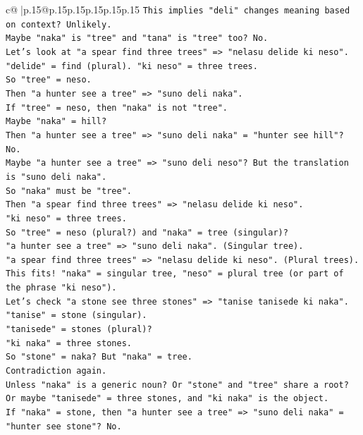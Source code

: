 \documentclass{article}
\begin{document}
{\begin{supertabular}{c@{$\;$}|p{.15\linewidth}@{}p{.15\linewidth}p{.15\linewidth}p{.15\linewidth}p{.15\linewidth}p{.15\linewidth}}
{{{\texttt{This implies "deli" changes meaning based on context? Unlikely.} \\
\texttt{Maybe "naka" is "tree" and "tana" is "tree" too? No.} \\
\texttt{Let's look at "a spear find three trees" => "nelasu delide ki neso".} \\
\texttt{"delide" = find (plural). "ki neso" = three trees.} \\
\texttt{So "tree" = neso.} \\
\texttt{Then "a hunter see a tree" => "suno deli naka".} \\
\texttt{If "tree" = neso, then "naka" is not "tree".} \\
\texttt{Maybe "naka" = hill?} \\
\texttt{Then "a hunter see a tree" => "suno deli naka" = "hunter see hill"? No.} \\
\texttt{Maybe "a hunter see a tree" => "suno deli neso"? But the translation is "suno deli naka".} \\
\texttt{So "naka" must be "tree".} \\
\texttt{Then "a spear find three trees" => "nelasu delide ki neso".} \\
\texttt{"ki neso" = three trees.} \\
\texttt{So "tree" = neso (plural?) and "naka" = tree (singular)?} \\
\texttt{"a hunter see a tree" => "suno deli naka". (Singular tree).} \\
\texttt{"a spear find three trees" => "nelasu delide ki neso". (Plural trees).} \\
\texttt{This fits! "naka" = singular tree, "neso" = plural tree (or part of the phrase "ki neso").} \\
\texttt{Let's check "a stone see three stones" => "tanise tanisede ki naka".} \\
\texttt{"tanise" = stone (singular).} \\
\texttt{"tanisede" = stones (plural)?} \\
\texttt{"ki naka" = three stones.} \\
\texttt{So "stone" = naka? But "naka" = tree.} \\
\texttt{Contradiction again.} \\
\texttt{Unless "naka" is a generic noun? Or "stone" and "tree" share a root?} \\
\texttt{Or maybe "tanisede" = three stones, and "ki naka" is the object.} \\
\texttt{If "naka" = stone, then "a hunter see a tree" => "suno deli naka" = "hunter see stone"? No.} \\
}}}
\end{supertabular}}
\end{document}
